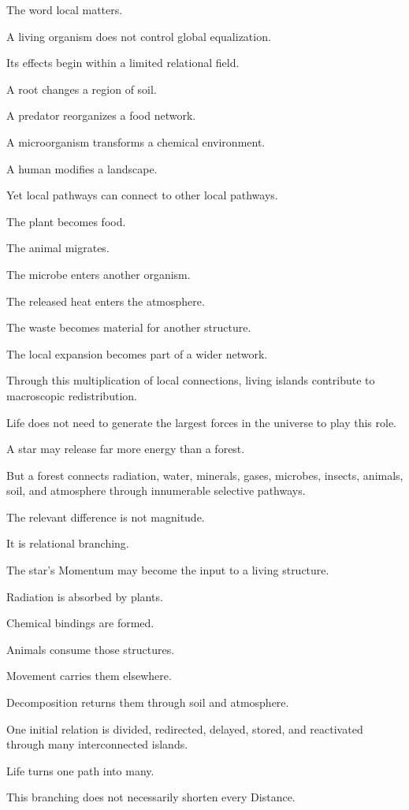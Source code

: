 The word local matters.

A living organism does not control global equalization.

Its effects begin within a limited relational field.

A root changes a region of soil.

A predator reorganizes a food network.

A microorganism transforms a chemical environment.

A human modifies a landscape.

Yet local pathways can connect to other local pathways.

The plant becomes food.

The animal migrates.

The microbe enters another organism.

The released heat enters the atmosphere.

The waste becomes material for another structure.

The local expansion becomes part of a wider network.

Through this multiplication of local connections, living islands contribute to macroscopic redistribution.

Life does not need to generate the largest forces in the universe to play this role.

A star may release far more energy than a forest.

But a forest connects radiation, water, minerals, gases, microbes, insects, animals, soil, and atmosphere through innumerable selective pathways.

The relevant difference is not magnitude.

It is relational branching.

The star’s Momentum may become the input to a living structure.

Radiation is absorbed by plants.

Chemical bindings are formed.

Animals consume those structures.

Movement carries them elsewhere.

Decomposition returns them through soil and atmosphere.

One initial relation is divided, redirected, delayed, stored, and reactivated through many interconnected islands.

Life turns one path into many.

This branching does not necessarily shorten every Distance.

